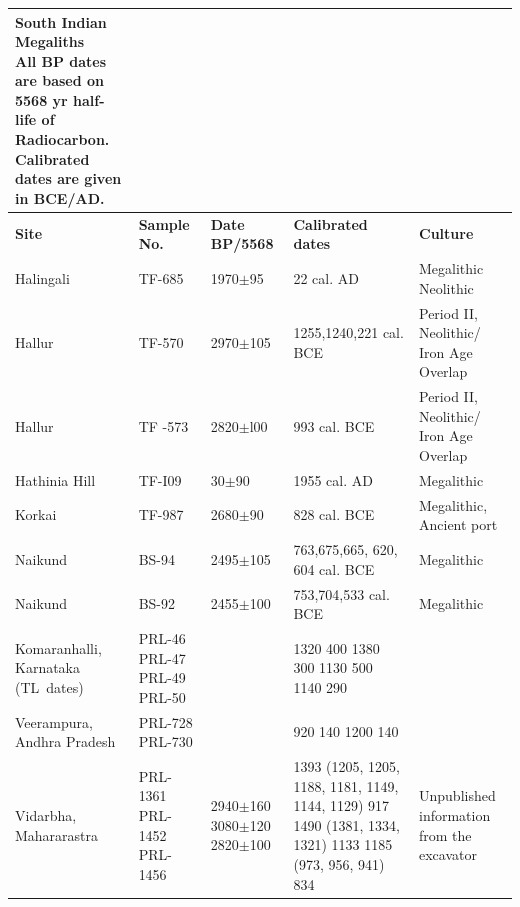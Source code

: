 {{\setlength\tabcolsep{2pt}
{\fontsize{7}{9}\selectfont
\begin{longtable}{|p{1.5cm}|p{1cm}|p{1.2cm}|p{1.8cm}|p{2.5cm}|}
\captionsetup{font=footnotesize}
\caption{South Indian Megaliths\\
All BP dates are based on 5568 yr half-life of Radiocarbon. \\
Calibrated dates are given in BCE/AD.}\label{table III.7}\\
\hline
\multicolumn{1}{|m{1.5cm}|}{\centering \textbf{Site}} &\multicolumn{1}{m{1cm}|}{\centering \textbf{Sample No.}}&\multicolumn{1}{m{1.2cm}|}{\centering \textbf{Date BP/5568}} & \multicolumn{1}{m{1.8cm}|}{\centering \textbf{Calibrated dates}}& \multicolumn{1}{m{2.5cm}|}{\centering \textbf{Culture}}\\
\endfirsthead
\hline
\endhead
\hline
\endfoot
\hline
Halingali & TF-685 & 1970$\pm$95 & 22 cal. AD & Megalithic Neolithic\\
Hallur & TF-570 & 2970$\pm$105 & 1255,1240,221 cal. BCE & Period II, Neolithic/ Iron Age Overlap\\
Hallur & TF -573 & 2820$\pm$l00 & 993 cal. BCE & Period II, Neolithic/ Iron Age Overlap\\
Hathinia Hill & TF-I09 & 30$\pm$90 & 1955 cal. AD & Megalithic\\
Korkai & TF-987 & 2680$\pm$90 & 828 cal. BCE & Megalithic, Ancient port\\
Naikund & BS-94 & 2495$\pm$105 & 763,675,665, 620, 604 cal. BCE &Megalithic\\
Naikund & BS-92 & 2455$\pm$100 & 753,704,533 cal. BCE &Megalithic\\
Komaranhalli, Karnataka \hbox{(TL dates)}  & PRL-46 PRL-47 PRL-49 PRL-50 &&1320 400 1380 300 1130 500 1140 290 & \\
Veerampura, Andhra Pradesh & PRL-728 PRL-730 && 920 140 1200 140 & \\
Vidarbha, \hbox{Mahararastra} & PRL-1361  PRL-1452  PRL-1456 & 2940$\pm$160 3080$\pm$120 2820$\pm$100 & 1393 (1205, 1205, 1188, 1181, 1149, 1144, 1129) 917 1490 (1381, 1334, 1321) 1133 1185 (973, 956, 941) 834 & Unpublished information from the excavator
\end{longtable}
}}

}
